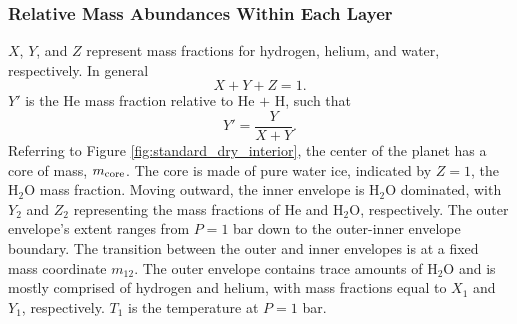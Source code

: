 \documentclass[11pt]{ucscthesisbs}
\begin{document}
\subsubsection{Relative Mass Abundances Within Each Layer}
$X$, $Y$, and $Z$ represent mass fractions for hydrogen, helium, and water, respectively. In general
\begin{equation}
  X + Y + Z = 1 .
\end{equation}
$Y'$ is the He mass fraction relative to He $+$ H, such that
\begin{equation}
  Y' = \frac{Y}{X+Y}.
\end{equation}
Referring to Figure \ref{fig:standard_dry_interior}, the center of the planet has a core of mass, $m_{\rm core}$. The core is made of pure water ice, indicated by $Z = 1$, the H$_{2}$O mass fraction. Moving outward, the inner envelope is H$_{2}$O dominated, with $Y_{2}$ and $Z_{2}$ representing the mass fractions of He and H$_{2}$O, respectively. The outer envelope's extent ranges from $P=1$ bar down to the outer-inner envelope boundary. The transition between the outer and inner envelopes is at a fixed mass coordinate $m_{12}$. The outer envelope contains trace amounts of H$_{2}$O and is mostly comprised of hydrogen and helium, with mass fractions equal to $X_{1}$ and $Y_{1}$, respectively. $T_{1}$ is the temperature at $P=1$ bar. 
\end{document}
